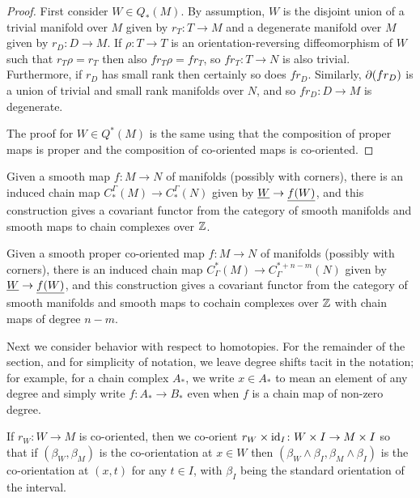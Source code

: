 \begin{proof}
	First consider $W \in Q_*(M)$.
	By assumption, $W$ is the disjoint union of a trivial manifold over $M$ given by $r_T \colon T \to M$ and a degenerate manifold over $M$ given by $r_D:D \to M$.
	If $\rho \colon T \to T$ is an orientation-reversing diffeomorphism of $W$ such that $r_T\rho = r_T$ then also $fr_T\rho = fr_T$, so $fr_T \colon T \to N$ is also trivial.
	Furthermore, if $r_D$ has small rank then certainly so does $fr_D$.
	Similarly, $\partial(fr_D)$ is a union of trivial and small rank manifolds over $N$, and so $fr_D:D \to M$ is degenerate.

	The proof for $W \in Q^*(M)$ is the same using that the composition of proper maps is proper and the composition of co-oriented maps is co-oriented.
\end{proof}

\begin{corollary}\label{C: homology chain map}
	Given a smooth map $f \colon M \to N$ of manifolds (possibly with corners), there is an induced chain map $C_*^\Gamma(M) \to C_*^\Gamma(N)$ given by $\underline{W} \to \underline{f(W)}$, and this construction gives a covariant functor from the category of smooth manifolds and smooth maps to chain complexes over $\mathbb{Z}$.
\end{corollary}

\begin{corollary}
	Given a smooth proper co-oriented map $f \colon M \to N$ of manifolds (possibly with corners), there is an induced chain map $C^*_\Gamma(M) \to C^{*+n-m}_\Gamma(N)$ given by $\underline{W} \to \underline{f(W)}$, and this construction gives a covariant functor from the category of smooth manifolds and smooth maps to cochain complexes over $\mathbb{Z}$ with chain maps of degree $n-m$.
\end{corollary}

Next we consider behavior with respect to homotopies. 
For the remainder of the section, and for simplicity of notation, we leave degree shifts tacit in the notation; for example, for a chain complex $A_*$, we write $x \in A_*$ to mean an element of any degree and simply write $f \colon A_* \to B_*$ even when $f$ is a chain map of non-zero degree.

\begin{convention}\label{homotopy product co-orientation convention}
	If $r_W \colon W \to M$ is co-oriented, then we co-orient $r_W \times \mathrm{id}_I \colon W \times I \to M \times I$ so that if $(\beta_W,\beta_M)$ is the co-orientation at $x \in W$ then $(\beta_W \wedge \beta_I,\beta_M \wedge \beta_I)$ is the co-orientation at $(x,t)$ for any $t \in I$, with $\beta_I$ being the standard orientation of the interval.
\end{convention}

